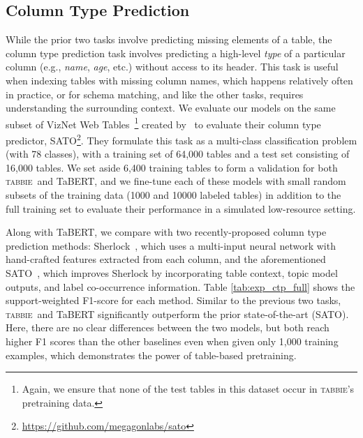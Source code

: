 \documentclass[11pt]{article}
\newcommand{\name}[0]{\textsc{tabbie}}
\begin{document}
\subsection{Column Type Prediction}
While the prior two tasks involve predicting missing elements of a table, the column type prediction task involves predicting a high-level \emph{type} of a particular column (e.g., \emph{name}, \emph{age}, etc.) without access to its header. This task is useful when indexing tables with missing column names, which happens relatively often in practice, or for schema matching\cite{Hulsebos2019SherlockAD, journals/vldb/RahmB01}, and like the other tasks, requires understanding the surrounding context. We evaluate our models on the same subset of VizNet Web Tables~\citep{DBLP:conf/chi/HuGHBZHK0SD19}\footnote{Again, we ensure that none of the test tables in this dataset occur in \name's pretraining data.} created by~\citet{zhang2019sato} to evaluate their column type predictor, SATO\footnote{\url{https://github.com/megagonlabs/sato}}. They formulate this task as a multi-class classification problem (with 78 classes), with a training set of 64,000 tables and a test set consisting of 16,000 tables. We set aside 6,400 training tables to form a validation for both \name\ and TaBERT, and we fine-tune each of these models with small random subsets of the training data (1000 and 10000 labeled tables) in addition to the full training set to evaluate their performance in a simulated low-resource setting. 



Along with TaBERT, we compare with two recently-proposed column type prediction methods: Sherlock~\cite{Hulsebos2019SherlockAD}, which uses a multi-input neural network with hand-crafted features extracted from each column, and the aforementioned SATO~\cite{zhang2019sato}, which improves Sherlock by incorporating table context, topic model outputs, and label co-occurrence information. Table \ref{tab:exp_ctp_full} shows the support-weighted F1-score for each method. Similar to the previous two tasks, \name\ and TaBERT significantly outperform the prior state-of-the-art (SATO). Here, there are no clear differences between the two models, but both reach higher F1 scores than the other baselines even when given only 1,000 training examples, which demonstrates the power of table-based pretraining.
\end{document}
